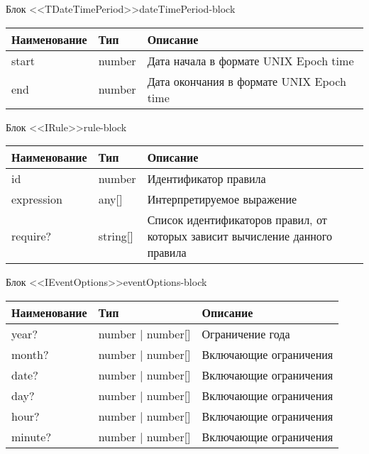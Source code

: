  \hypertarget{app:B}{\label{app:B}}


\begin{tbl}{Блок <<TDateTimePeriod>>}{dateTimePeriod-block}
  \begin{tabularx}{\textwidth}{| p{3cm} | p{6cm} | X |}
  \hline Наименование & Тип    & Описание                                 \\
  \hline start        & number & Дата начала в формате UNIX Epoch time    \\
  \hline end          & number & Дата окончания в формате UNIX Epoch time \\
  \hline
  \end{tabularx}
\end{tbl}

\begin{tbl}{Блок <<IRule>>}{rule-block}
  \begin{tabularx}{\textwidth}{| p{3cm} | p{6cm} | X |}
  \hline Наименование & Тип      & Описание                                                                     \\
  \hline id           & number   & Идентификатор правила                                                        \\
  \hline expression   & any[]    & Интерпретируемое выражение                                                   \\
  \hline require?     & string[] & Список идентификаторов правил, от которых зависит вычисление данного правила \\
  \hline
  \end{tabularx}
\end{tbl}

\begin{tbl}{Блок <<IEventOptions>>}{eventOptions-block}
  \begin{tabularx}{\textwidth}{| p{3cm} | p{6cm} | X |}
  \hline Наименование    & Тип               & Описание               \\
  \hline year?           & number | number[] & Ограничение года       \\
  \hline month?          & number | number[] & Включающие ограничения \\
  \hline date?           & number | number[] & Включающие ограничения \\
  \hline day?            & number | number[] & Включающие ограничения \\
  \hline hour?           & number | number[] & Включающие ограничения \\
  \hline minute?         & number | number[] & Включающие ограничения \\
  \hline
  \end{tabularx}
\end{tbl}

